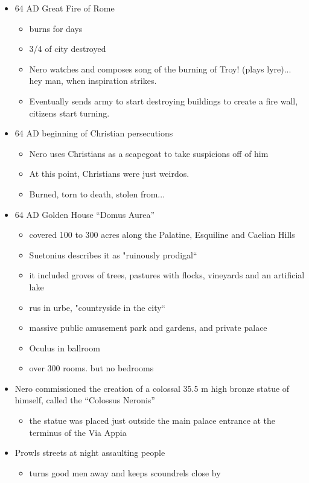 \documentclass[12pt, twoside]{article}
\begin{document}
\begin{itemize}
\item 64 AD Great Fire of Rome
	\begin{itemize}
	\item burns for days
	\item 3/4 of city destroyed
	\item Nero watches and composes song of the burning of Troy! (plays lyre)... hey man, when inspiration strikes.
	\item Eventually sends army to start destroying buildings to create a fire wall, citizens start turning.
	\end{itemize}
\item 64 AD beginning of Christian persecutions
	\begin{itemize}
	\item Nero uses Christians as a scapegoat to take suspicions off of him
	\item At this point, Christians were just weirdos.
	\item Burned, torn to death, stolen from...
	\end{itemize}
\item 64 AD Golden House “Domus Aurea”
	\begin{itemize}
	\item covered 100 to 300 acres along the Palatine, Esquiline and Caelian Hills
	\item Suetonius describes it as "ruinously prodigal“
	\item it included groves of trees, pastures with flocks, vineyards and an artificial lake
	\item rus in urbe, "countryside in the city“
	\item massive public amusement park and gardens, and private palace
	\item Oculus in ballroom
	\item over 300 rooms. but no bedrooms
	\end{itemize}
\item Nero commissioned the creation of a colossal 35.5 m high bronze statue of himself, called the “Colossus Neronis”
	\begin{itemize}
	\item the statue was placed just outside the main palace entrance at the terminus of the Via Appia
	\end{itemize}
\item Prowls streets at night assaulting people
	\begin{itemize}
	\item turns good men away and keeps scoundrels close by

\end{itemize}
\end{itemize}
\end{document}
